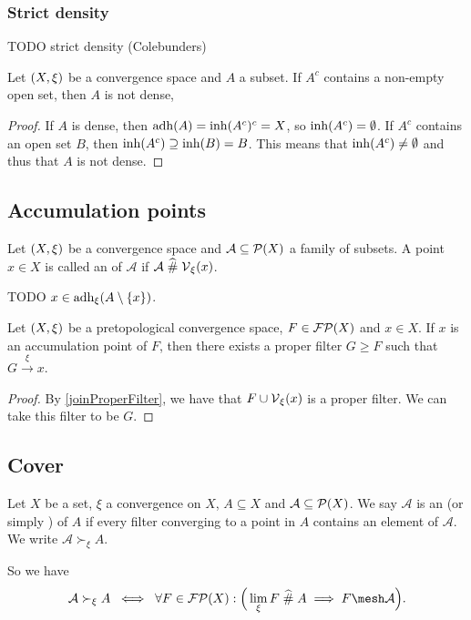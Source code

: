 \subsubsection{Strict density}
TODO strict density (Colebunders)

\begin{lemma} \label{openDensityLemma}
Let $\left( X, \xi \right)$ be a convergence space and $A$ a subset.
If $A^c$ contains a non-empty open set, then $A$ is not dense,
\end{lemma}
\begin{proof}
If $A$ is dense, then $\operatorname{adh}(A) = \operatorname{inh}(A^c)^c = X$, so $\operatorname{inh}(A^c) = \emptyset$. If $A^c$ contains an open set $B$, then $\operatorname{inh}(A^c) \supseteq \operatorname{inh}(B) = B$. This means that $\operatorname{inh}(A^c) \neq \emptyset$ and thus that $A$ is not dense.
\end{proof}

\subsection{Accumulation points}
\begin{definition}
Let $\left( X,\xi \right)$ be a convergence space and $\mathcal{A}\subseteq \operatorname{\mathcal{P}}(X)$ a family of subsets. A point $x\in X$ is called an  of $\mathcal{A}$ if $\mathcal{A}\mathrel{\widehat{\#}} \operatorname{\mathcal{V}}_\xi(x)$.
\end{definition}

TODO $x\in \operatorname{adh}_\xi(A\setminus\{x\})$.

\begin{proposition} \label{subfilterToAccumulationPoint}
Let $\left( X,\xi \right)$ be a pretopological convergence space, $F\in\operatorname{\mathcal{FP}}(X)$ and $x\in X$. If $x$ is an accumulation point of $F$, then there exists a proper filter $G \geq F$ such that $G\overset{\xi}{\longrightarrow} x$. 
\end{proposition}
\begin{proof}
By \ref{joinProperFilter}, we have that $F\cup \operatorname{\mathcal{V}}_\xi(x)$ is a proper filter. We can take this filter to be $G$.
\end{proof}

\subsection{Cover}
\begin{definition}
Let $X$ be a set, $\xi$ a convergence on $X$, $A\subseteq X$ and $\mathcal{A}\subseteq \operatorname{\mathcal{P}}(X)$.
We say $\mathcal{A}$ is an  (or simply ) of $A$ if every filter converging to a point in $A$ contains an element of $\mathcal{A}$. We write $\mathcal{A} \succ_\xi A$.
\end{definition}
So we have
\[ \mathcal{A} \succ_\xi A \;\iff\; \forall F\in \powerfilters(X): \Big( \lim_\xi F \amesh A \implies F \mesh \mathcal{A} \Big). \]

